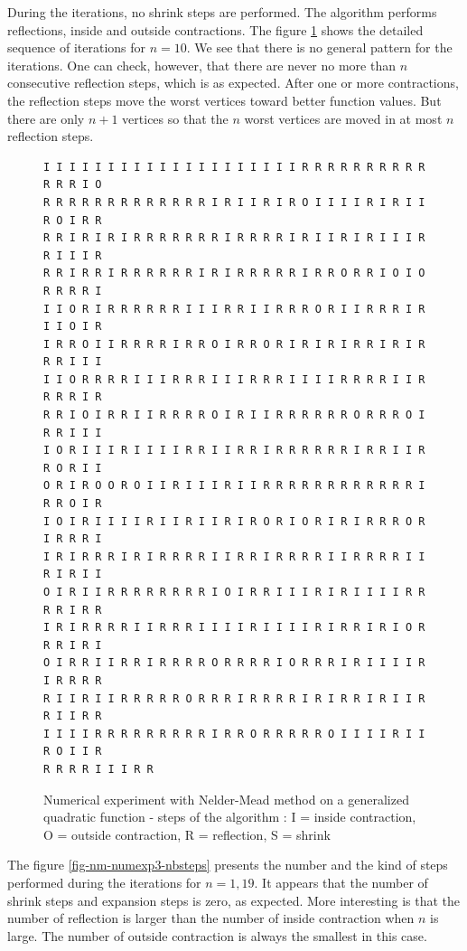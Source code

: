 During the iterations, no shrink steps are performed. The 
algorithm performs reflections, inside and outside contractions.
The figure \ref{fig-nm-numexp3-steps} shows the detailed sequence of 
iterations for $n=10$. We see that there is no general 
pattern for the iterations. One can check, however, that there 
are never no more than $n$ consecutive reflection steps, which is 
as expected. After one or more contractions, the reflection
steps move the worst vertices toward better function values.
But there are only $n+1$ vertices so that the $n$ worst 
vertices are moved in at most $n$ reflection steps.

\begin{figure}[htbp]
\begin{center}
\begin{verbatim}
I I I I I I I I I I I I I I I I I I I I R R R R R R R R R R R R R I O 
R R R R R R R R R R R R R I R I I R I R O I I I I R I R I I R O I R R 
R R I R I R I R R R R R R R I R R R R I R I I R I R I I I R R I I I R 
R R I R R I R R R R R R I R I R R R R R I R R O R R I O I O R R R R I 
I I O R I R R R R R R I I I R R I I R R R O R I I R R R I R I I O I R 
I R R O I I R R R R I R R O I R R O R I R I R I R R I R I R R R I I I 
I I O R R R R I I I R R R I I I R R R I I I I R R R R I I R R R R I R 
R R I O I R R I I R R R R O I R I I R R R R R R O R R R O I R R I I I 
I O R I I I R I I I I R R I I R R I R R R R R R I R R I I R R O R I I 
O R I R O O R O I I R I I I R I I R R R R R R R R R R R R I R R O I R 
I O I R I I I I R I I R I I R I R O R I O R I R I R R R O R I R R R I 
I R I R R R I R I R R R R I I R R I R R R R I I R R R R I I R I R I I 
O I R I I R R R R R R R R I O I R R I I I R I R I I I I R R R R I R R 
I R I R R R R I I R R R I I I I R I I I I R I R R I R I O R R R I R I 
O I R R I I R R I R R R R O R R R R I O R R R I R I I I I R I R R R R 
R I I R I I R R R R R O R R R I R R R R I R I R R I R I I R R I I R R 
I I I I R R R R R R R R R I R R O R R R R R O I I I I R I I R O I I R 
R R R R I I I R R
\end{verbatim}
\end{center}
\caption{Numerical experiment with Nelder-Mead method on a generalized 
quadratic function - steps of the algorithm : I = inside contraction, O = outside contraction, 
R = reflection, S = shrink}
\label{fig-nm-numexp3-steps}
\end{figure}

The figure \ref{fig-nm-numexp3-nbsteps} presents the number and 
the kind of steps performed during the iterations for $n=1,19$.
It appears that the number of shrink steps and expansion steps is zero, as expected.
More interesting is that the number of reflection is 
larger than the number of inside contraction when $n$ 
is large. The number of outside contraction is always 
the smallest in this case.

